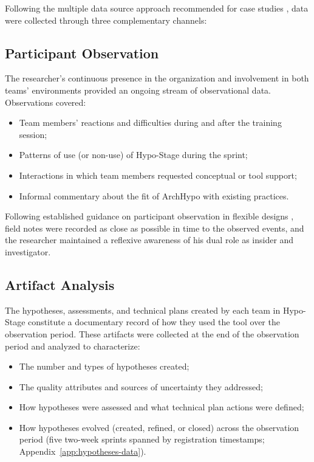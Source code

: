 Following the multiple data source approach recommended for case studies \citep{robson2016,yin2009}, data were collected through three complementary channels:

\subsection{Participant Observation}
\label{subsec:participant-observation}

The researcher's continuous presence in the organization and involvement in both
teams' environments provided an ongoing stream of observational data. Observations
covered: 

\begin{itemize}
  \item[(i)] Team members' reactions and difficulties during and after the training
  session;
  \item[(ii)] Patterns of use (or non-use) of Hypo-Stage during the sprint;
  \item[(iii)] Interactions in which team members requested conceptual or tool support;
  \item[(iv)] Informal commentary about the fit of ArchHypo with existing practices.
\end{itemize}

Following established guidance on participant observation in flexible designs \citep{robson2016}, field notes were recorded as close as possible in time to the observed events, and the researcher maintained a reflexive awareness of his dual role as insider and investigator.

\subsection{Artifact Analysis}
\label{subsec:artifact-analysis}

The hypotheses, assessments, and technical plans created by each team in Hypo-Stage
constitute a documentary record of how they used the tool over the observation period.
These artifacts were collected at the end of the observation period and analyzed to
characterize:

\begin{itemize}
  \item[(i)] The number and types of hypotheses created;
  \item[(ii)] The quality attributes and sources of uncertainty they addressed;
  \item[(iii)] How hypotheses were assessed and what technical plan actions were defined;
  \item[(iv)] How hypotheses evolved (created, refined, or closed) across the observation period (five two-week sprints spanned by registration timestamps; Appendix~\ref{app:hypotheses-data}).
\end{itemize}

